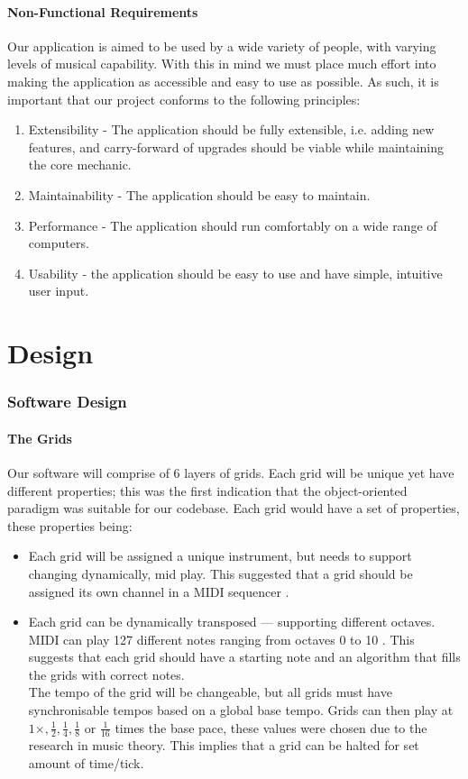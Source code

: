 \documentclass[10pt,a4paper]{article}
\begin{document}
\subsection{Non-Functional Requirements}
Our application is aimed to be used by a wide variety of people, with varying levels of musical capability. With this in mind we must place much effort into making the application as accessible and easy to use as possible. As such, it is important that our project conforms to the following principles:

\begin{enumerate}
\item Extensibility - The application should be fully extensible, i.e. adding new features, and carry-forward of upgrades should be viable while maintaining the core mechanic.
\item Maintainability - The application should be easy to maintain.
\item Performance - The application should run comfortably on a wide range of computers.
\item Usability - the application should be easy to use and have simple, intuitive user input.
\end{enumerate}

\pagebreak
\part{Design}
\section{Software Design}
\subsection{The Grids}
Our software will comprise of 6 layers of grids. Each grid will be unique yet have different properties; this was the first indication that the object-oriented paradigm was suitable for our codebase. Each grid would have a set of properties, these properties being:
\begin{itemize}
\item Each grid will be assigned a unique instrument, but needs to support changing dynamically, mid play. This suggested that a grid should be assigned its own channel in a MIDI sequencer \cite{rees}.
\item Each grid can be dynamically transposed --- supporting different octaves. MIDI can play 127 different notes ranging from octaves 0 to 10 \cite{swift}. This suggests that each grid should have a starting note and an algorithm that fills the grids with correct notes.\\
The tempo of the grid will be changeable, but all grids must have synchronisable tempos based on a global base tempo. Grids can then play at $ 1 \times , \frac{1}{2}, \frac{1}{4}, \frac{1}{8}$ or $\frac{1}{16} $ times the base pace, these values were chosen due to the research in music theory. This implies that a grid can be halted for set amount of time/tick.
\end{itemize}
\end{document}
